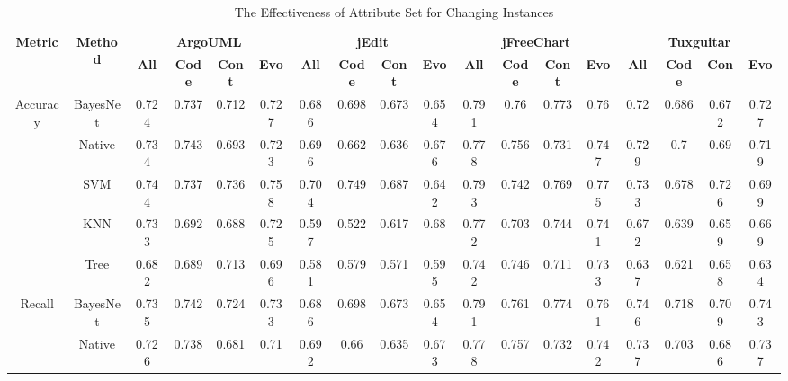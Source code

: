 {\begin{table*}[ht]
\scriptsize
\caption{The Effectiveness of Attribute Set for Changing Instances}
\label{changingset}
\centering
\begin{tabular}{|c|c|c|c|c|c|c|c|c|c|c|c|c|c|c|c|c|c|}
\hline
\multirow{2}{*}{\textbf{Metric}}&\multirow{2}{*}{\textbf{Method}}&\multicolumn{4}{|c|}{\textbf{ArgoUML}}&\multicolumn{4}{|c|}{\textbf{jEdit}}&\multicolumn{4}{|c|}{\textbf{jFreeChart}}&\multicolumn{4}{|c|}{\textbf{Tuxguitar}}\\
\cline{3-18}
&&\textbf{All}&\textbf{Code}&\textbf{Cont}&\textbf{Evo}&\textbf{All}&\textbf{Code}&\textbf{Cont}&\textbf{Evo}&\textbf{All}&\textbf{Code}&\textbf{Cont}&\textbf{Evo}&\textbf{All}&\textbf{Code}&\textbf{Con}&\textbf{Evo}~\\
\hline
\multirow{5}{*}{Accuracy}
&BayesNet&	0.724&	0.737&	0.712&	0.727&		0.686&	0.698&	0.673&	0.654&	0.791&	0.76&	0.773&	0.76&		0.72&	0.686&	0.672&	0.727\\
&Native&	0.734&	0.743&	0.693&	0.723&		0.696&	0.662&	0.636&	0.676&	0.778&	0.756&	0.731&	0.747&		0.729&	0.7	&0.69&	0.719\\
&SVM&	0.744&	0.737&	0.736&	0.758&		0.704&	0.749&	0.687&	0.642&		0.793&	0.742&	0.769&	0.775&		0.733&	0.678&	0.726&	0.699\\
&KNN&	0.733&	0.692&	0.688&	0.725&		0.597&	0.522&	0.617&	0.68&		0.772&	0.703&	0.744&	0.741&		0.672&	0.639&	0.659&	0.669\\
&Tree&	0.682&	0.689&	0.713&	0.696&		0.581&	0.579&	0.571&	0.595&		0.742&	0.746&	0.711&	0.733&		0.637&	0.621&	0.658&	0.634\\
\hline
\multirow{5}{*}{Recall}
&BayesNet&	0.735&	0.742&	0.724&	0.733&		0.686&	0.698&	0.673&	0.654&	0.791&	0.761&	0.774&	0.761&		0.746&	0.718&	0.709&	0.743\\
&Native&	0.726&	0.738&	0.681&	0.71&		0.692&	0.66&	0.635&	0.673&		0.778&	0.757&	0.732&	0.742&		0.737&	0.703&	0.686&	0.737\\

\end{tabular}
\end{table*}}
